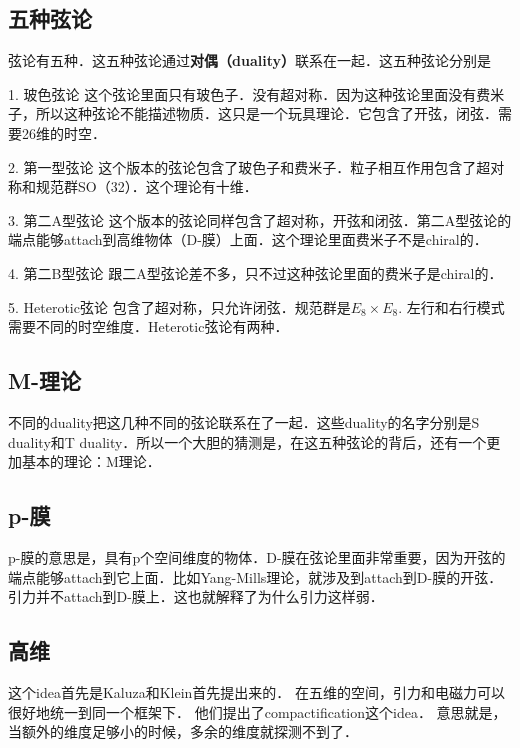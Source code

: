 \subsection{五种弦论}

弦论有五种．这五种弦论通过\textbf{对偶（duality）}联系在一起．这五种弦论分别是

1. 玻色弦论
这个弦论里面只有玻色子．没有超对称．因为这种弦论里面没有费米子，所以这种弦论不能描述物质．这只是一个玩具理论．它包含了开弦，闭弦．需要26维的时空．

2. 第一型弦论
这个版本的弦论包含了玻色子和费米子．粒子相互作用包含了超对称和规范群SO（32）．这个理论有十维．

3. 第二A型弦论
这个版本的弦论同样包含了超对称，开弦和闭弦．第二A型弦论的端点能够attach到高维物体（D-膜）上面．这个理论里面费米子不是chiral的．

4. 第二B型弦论
跟二A型弦论差不多，只不过这种弦论里面的费米子是chiral的．

5. Heterotic弦论
包含了超对称，只允许闭弦．规范群是$E_8\times E_8$. 左行和右行模式需要不同的时空维度．Heterotic弦论有两种．

\subsection{M-理论}
不同的duality把这几种不同的弦论联系在了一起．这些duality的名字分别是S duality和T duality．所以一个大胆的猜测是，在这五种弦论的背后，还有一个更加基本的理论：M理论．

\subsection{p-膜}
p-膜的意思是，具有p个空间维度的物体．D-膜在弦论里面非常重要，因为开弦的端点能够attach到它上面．比如Yang-Mills理论，就涉及到attach到D-膜的开弦． 引力并不attach到D-膜上．这也就解释了为什么引力这样弱．

\subsection{高维}
这个idea首先是Kaluza和Klein首先提出来的． 在五维的空间，引力和电磁力可以很好地统一到同一个框架下． 他们提出了compactification这个idea．
意思就是，当额外的维度足够小的时候，多余的维度就探测不到了． 
